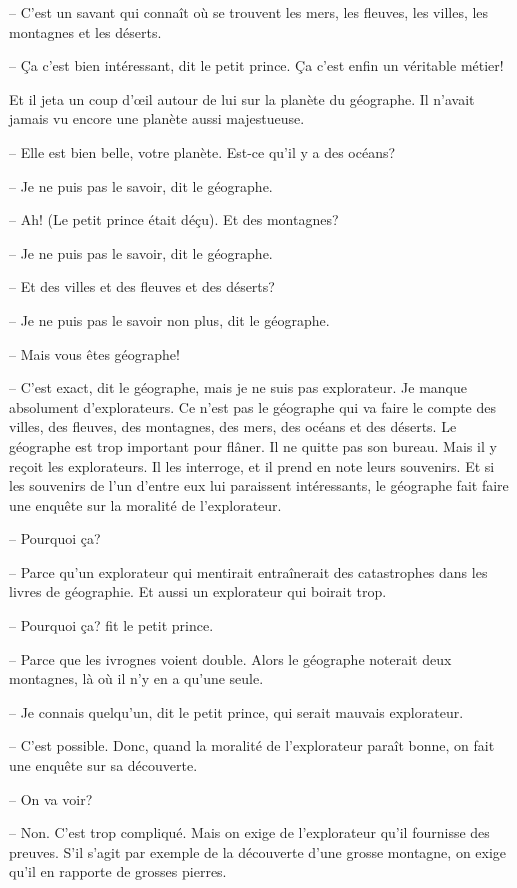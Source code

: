 \begin{Parallel}[p]{}{}
{-- C'est un savant qui connaît où se trouvent les
mers, les fleuves, les villes, les montagnes et les
déserts.

-- Ça c'est bien intéressant, dit le petit prince. Ça
c'est enfin un véritable métier!

Et il jeta un coup d’œil autour de lui sur la planète du géographe. Il n'avait jamais vu encore une planète aussi majestueuse.

-- Elle est bien belle, votre planète. Est-ce qu'il y a
des océans?

-- Je ne puis pas le savoir, dit le géographe.

-- Ah! (Le petit prince était déçu). Et des montagnes?

-- Je ne puis pas le savoir, dit le géographe.

-- Et des villes et des fleuves et des déserts?

-- Je ne puis pas le savoir non plus, dit le géographe.

-- Mais vous êtes géographe!

-- C'est exact, dit le géographe, mais je ne suis
pas explorateur. Je manque absolument d'explorateurs. Ce n'est pas le géographe qui va faire le
compte des villes, des fleuves, des montagnes, des mers, des océans et des déserts. Le géographe est
trop important pour flâner. Il ne quitte pas son
bureau. Mais il y reçoit les explorateurs. Il les interroge, et il prend en note leurs souvenirs. Et si les
souvenirs de l'un d'entre eux lui paraissent intéressants, le géographe fait faire une enquête sur la
moralité de l'explorateur.

-- Pourquoi ça?

-- Parce qu'un explorateur qui mentirait entraînerait des catastrophes dans les livres de géographie. Et aussi un explorateur qui boirait trop.

-- Pourquoi ça? fit le petit prince.

-- Parce que les ivrognes voient double. Alors le
géographe noterait deux montagnes, là où il n'y en a
qu'une seule.

-- Je connais quelqu'un, dit le petit prince, qui
serait mauvais explorateur.

-- C'est possible. Donc, quand la moralité de
l'explorateur paraît bonne, on fait une enquête sur
sa découverte.

-- On va voir?

-- Non. C'est trop compliqué. Mais on exige de
l'explorateur qu'il fournisse des preuves. S'il s'agit
par exemple de la découverte d'une grosse montagne, on exige qu'il en rapporte de grosses
pierres.

}
\end{Parallel}
